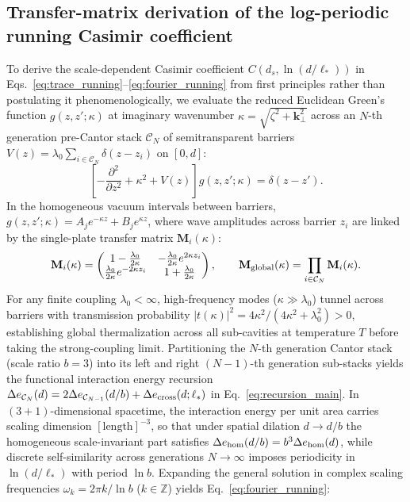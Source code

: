 \documentclass[pdflatex,sn-nature]{sn-jnl}
\begin{document}
\subsection*{Transfer-matrix derivation of the log-periodic running Casimir coefficient}
To derive the scale-dependent Casimir coefficient $C(d_s, \ln(d/\ell_*))$ in Eqs.~\eqref{eq:trace_running}--\eqref{eq:fourier_running} from first principles rather than postulating it phenomenologically\cite{gordon2026prd}, we evaluate the reduced Euclidean Green's function $g(z, z'; \kappa)$ at imaginary wavenumber $\kappa = \sqrt{\zeta^2 + \mathbf{k}_\perp^2}$ across an $N$-th generation pre-Cantor stack $\mathcal{C}_N$ of semitransparent barriers $V(z) = \lambda_0 \sum_{i \in \mathcal{C}_N} \delta(z - z_i)$ on $[0, d]$:
\begin{equation}
\left[ -\frac{\partial^2}{\partial z^2} + \kappa^2 + V(z) \right] g(z, z'; \kappa) = \delta(z - z').
\end{equation}
In the homogeneous vacuum intervals between barriers, $g(z, z'; \kappa) = A_j e^{-\kappa z} + B_j e^{\kappa z}$, where wave amplitudes across barrier $z_i$ are linked by the single-plate transfer matrix $\mathbf{M}_i(\kappa)$:
\begin{equation}
\mathbf{M}_i(\kappa) = \begin{pmatrix} 1 - \frac{\lambda_0}{2\kappa} & -\frac{\lambda_0}{2\kappa} e^{2\kappa z_i} \\ \frac{\lambda_0}{2\kappa} e^{-2\kappa z_i} & 1 + \frac{\lambda_0}{2\kappa} \end{pmatrix}, \qquad \mathbf{M}_{\rm global}(\kappa) = \prod_{i \in \mathcal{C}_N} \mathbf{M}_i(\kappa).
\end{equation}
For any finite coupling $\lambda_0 < \infty$, high-frequency modes ($\kappa \gg \lambda_0$) tunnel across barriers with transmission probability $|t(\kappa)|^2 = 4\kappa^2 / (4\kappa^{2} + \lambda_0^2) > 0$, establishing global thermalization across all sub-cavities at temperature $T$ before taking the strong-coupling limit\cite{gordon2026prd}. Partitioning the $N$-th generation Cantor stack (scale ratio $b=3$) into its left and right $(N-1)$-th generation sub-stacks yields the functional interaction energy recursion $\Delta e_{\mathcal{C}_N}(d) = 2\Delta e_{\mathcal{C}_{N-1}}(d/b) + \Delta e_{\rm cross}(d; \ell_*)$ in Eq.~\eqref{eq:recursion_main}. In $(3+1)$-dimensional spacetime, the interaction energy per unit area carries scaling dimension $[\text{length}]^{-3}$, so that under spatial dilation $d \to d/b$ the homogeneous scale-invariant part satisfies $\Delta e_{\rm hom}(d/b) = b^3 \Delta e_{\rm hom}(d)$, while discrete self-similarity across generations $N \to \infty$ imposes periodicity in $\ln(d/\ell_*)$ with period $\ln b$. Expanding the general solution in complex scaling frequencies $\omega_k = 2\pi k / \ln b$ ($k \in \mathbb{Z}$) yields Eq.~\eqref{eq:fourier_running}:
\end{document}

